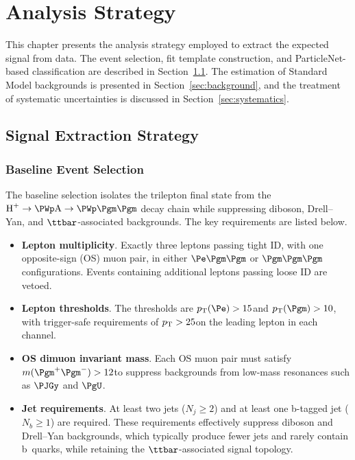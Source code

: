 \chapter{Analysis Strategy}
\label{ch:strategy}

This chapter presents the analysis strategy employed to extract the expected signal from data. The event selection, fit template construction, and ParticleNet-based classification are described in Section~\ref{sec:signal_extraction}. The estimation of Standard Model backgrounds is presented in Section~\ref{sec:background}, and the treatment of systematic uncertainties is discussed in Section~\ref{sec:systematics}.

\section{Signal Extraction Strategy}
\label{sec:signal_extraction}

\subsection{Baseline Event Selection}
\label{ssec:baseline_selection}

The baseline selection isolates the trilepton final state from the $\PHp \to \PWp \PA \to \PWp \Pgm\Pgm$ decay chain while suppressing diboson, Drell--Yan, and $\ttbar$-associated backgrounds. The key requirements are listed below.

\begin{itemize}
\item \textbf{Lepton multiplicity}. Exactly three leptons passing tight ID, with one opposite-sign (OS) muon pair, in either $\Pe\Pgm\Pgm$ or $\Pgm\Pgm\Pgm$ configurations. Events containing additional leptons passing loose ID are vetoed.
\item \textbf{Lepton \pT thresholds}. The thresholds are $\pT(\Pe) > 15$\GeV and $\pT(\Pgm) > 10$\GeV, with trigger-safe requirements of $p_{\mathrm{T}} > 25$\GeV on the leading lepton in each channel.
\item \textbf{OS dimuon invariant mass}. Each OS muon pair must satisfy $m(\Pgm^+\Pgm^-) > 12$\GeV to suppress backgrounds from low-mass resonances such as $\PJGy$ and $\PgU$.
\item \textbf{Jet requirements}. At least two jets ($N_j \geq 2$) and at least one b-tagged jet ($N_b \geq 1$) are required. These requirements effectively suppress diboson and Drell--Yan backgrounds, which typically produce fewer jets and rarely contain b~quarks, while retaining the $\ttbar$-associated signal topology.
\end{itemize}

